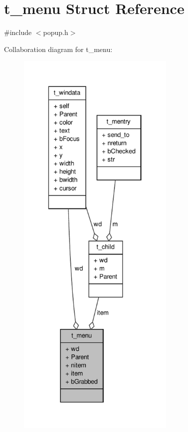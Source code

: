 \hypertarget{structt__menu}{\section{t\-\_\-menu \-Struct \-Reference}
\label{structt__menu}
}


{\ttfamily \#include $<$popup.\-h$>$}



\-Collaboration diagram for t\-\_\-menu\-:
\nopagebreak
\begin{figure}[H]
\begin{center}
\leavevmode
\includegraphics[height=550pt]{structt__menu__coll__graph}
\end{center}
\end{figure}
